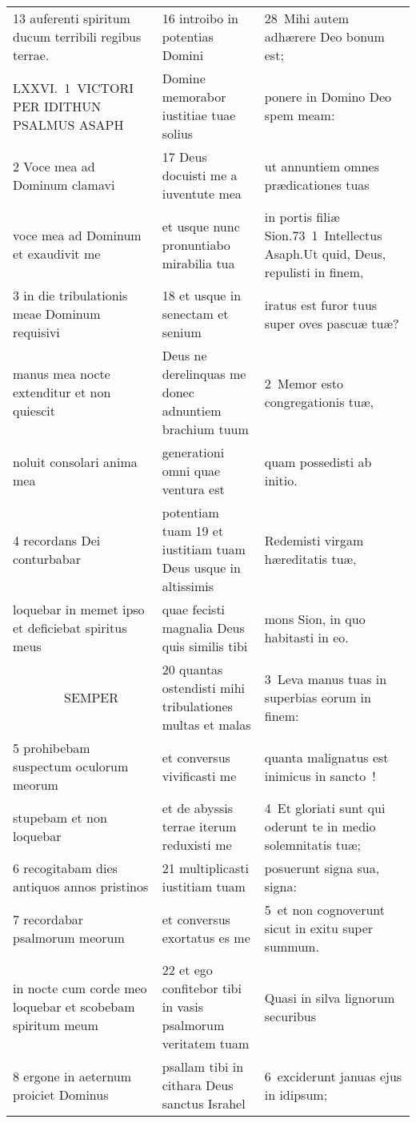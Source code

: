 \documentclass{article}
\begin{document}
\begin{longtable}{@{}p{}p{}p{}@{}}
13 auferenti spiritum ducum terribili regibus terrae.	&	16 introibo in potentias Domini	&	28 Mihi autem adhærere Deo bonum est;	\\
LXXVI. 1 VICTORI PER IDITHUN PSALMUS ASAPH	&	Domine memorabor iustitiae tuae solius	&	ponere in Domino Deo spem meam:	\\
2 Voce mea ad Dominum clamavi	&	17 Deus docuisti me a iuventute mea	&	ut annuntiem omnes prædicationes tuas	\\
voce mea ad Dominum et exaudivit me	&	et usque nunc pronuntiabo mirabilia tua	&	in portis filiæ Sion.73 1 Intellectus Asaph.Ut quid, Deus, repulisti in finem,	\\
3 in die tribulationis meae Dominum requisivi	&	18 et usque in senectam et senium	&	iratus est furor tuus super oves pascuæ tuæ?	\\
manus mea nocte extenditur et non quiescit	&	Deus ne derelinquas me donec adnuntiem brachium tuum	&	2 Memor esto congregationis tuæ,	\\
noluit consolari anima mea	&	generationi omni quae ventura est	&	quam possedisti ab initio.	\\
4 recordans Dei conturbabar	&	potentiam tuam 19 et iustitiam tuam Deus usque in altissimis	&	Redemisti virgam hæreditatis tuæ,	\\
loquebar in memet ipso et deficiebat spiritus meus	&	quae fecisti magnalia Deus quis similis tibi	&	mons Sion, in quo habitasti in eo.	\\
    SEMPER	&	20 quantas ostendisti mihi tribulationes multas et malas	&	3 Leva manus tuas in superbias eorum in finem:	\\
5 prohibebam suspectum oculorum meorum	&	et conversus vivificasti me	&	quanta malignatus est inimicus in sancto !	\\
stupebam et non loquebar	&	et de abyssis terrae iterum reduxisti me	&	4 Et gloriati sunt qui oderunt te in medio solemnitatis tuæ;	\\
6 recogitabam dies antiquos annos pristinos	&	21 multiplicasti iustitiam tuam	&	posuerunt signa sua, signa:	\\
7 recordabar psalmorum meorum	&	et conversus exortatus es me	&	5 et non cognoverunt sicut in exitu super summum.	\\
in nocte cum corde meo loquebar et scobebam spiritum meum	&	22 et ego confitebor tibi in vasis psalmorum veritatem tuam	&	Quasi in silva lignorum securibus	\\
8 ergone in aeternum proiciet Dominus	&	psallam tibi in cithara Deus sanctus Israhel	&	6 exciderunt januas ejus in idipsum;	\\

\end{longtable}
\end{document}
